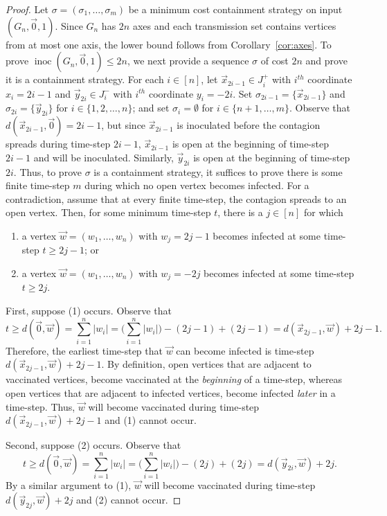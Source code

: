 \documentclass[unknownkeysallowed]{article}
\theoremstyle{definition}\newtheorem{strategy}{Strategy}
\theoremstyle{definition}\newtheorem{notation}{Notation}[theorem]
\DeclareMathOperator{\inoc}{inoc}
\begin{document}
\begin{proof} 
  Let $\sigma=(\sigma_1,\dots,\sigma_m)$ be a minimum cost containment strategy on input $(G_n,\vec{0},1)$.  
  Since $G_n$ has $2n$ axes and each transmission set contains vertices from at most one axis, the lower bound follows from Corollary~\ref{cor:axes}.  
  To prove $\inoc(G_n,\vec{0},1) \leq 2n$, we next provide a sequence $\sigma$ of cost $2n$ and prove it is a containment strategy. 
  For each $i \in [n]$, let $\vec{x}_{2i-1} \in J^+_i$ with $i^{th}$ coordinate $x_i = 2i-1$ and $\vec{y}_{2i} \in J^-_i$ with $i^{th}$ coordinate $y_i = -2i$.  Set $\sigma_{2i-1}  = \{ \vec{x}_{2i-1}\}$ and $\sigma_{2i} = \{\vec{y}_{2i}\}$ for $i \in \{1,2,\dots,n\}$; and set $\sigma_i = \emptyset$ for $i \in \{n+1, \dots, m\}$. 
  Observe that $d(\vec{x}_{2i-1},\vec{0})=2i-1$, but since $\vec{x}_{2i-1}$ is inoculated before the contagion spreads during time-step $2i-1$, $\vec{x}_{2i-1}$ is open at the beginning of time-step $2i-1$ and will be inoculated.  
  Similarly, $\vec{y}_{2i}$ is open at the beginning of time-step $2i$. 
  Thus, to prove $\sigma$ is a containment strategy, it suffices to prove there is some finite time-step $m$ during which no open vertex becomes infected.
  For a contradiction, assume that at every finite time-step, the contagion spreads to an open vertex. Then, for some minimum time-step $t$, there is a $j \in [n]$ for which
  \begin{enumerate} 
 \item[(1)] a vertex $\vec{w} = (w_1,\dots,w_n)$ with $w_j= 2j-1$ becomes infected at some time-step $t \geq 2j-1$; or 
 \item[(2)] a vertex $\vec{w} = (w_1,\dots,w_n)$ with $w_j= -2j$  becomes infected at some time-step $t \geq 2j$.
 \end{enumerate}
 
First, suppose (1) occurs. Observe that $$t \geq d(\vec{0},\vec{w}) = \sum_{i=1}^n |w_i| = \big(\sum_{i=1}^n |w_i|\big) - (2j-1) + (2j-1) = d(\vec{x}_{2j-1},\vec{w})+2j-1.$$  Therefore, the earliest time-step that $\vec{w}$ can become infected is time-step $d(\vec{x}_{2j-1},\vec{w})+2j-1$.  By definition, open vertices that are adjacent to vaccinated vertices, become vaccinated at the {\it beginning} of a time-step, whereas open vertices that are adjacent to infected vertices, become infected {\it later} in a time-step.  Thus, $\vec{w}$ will become vaccinated during time-step $d(\vec{x}_{2j-1},\vec{w})+2j-1$ and (1) cannot occur.

Second, suppose (2) occurs. Observe that $$t \geq d(\vec{0},\vec{w}) = \sum_{i=1}^n |w_i| = \big( \sum_{i=1}^n |w_i| \big) - (2j) + (2j) = d(\vec{y}_{2i},\vec{w})+2j.$$ 
By a similar argument to (1),  $\vec{w}$ will become vaccinated during time-step $d(\vec{y}_{2j},\vec{w})+2j$ and (2) cannot occur.


\end{proof}
\end{document}
